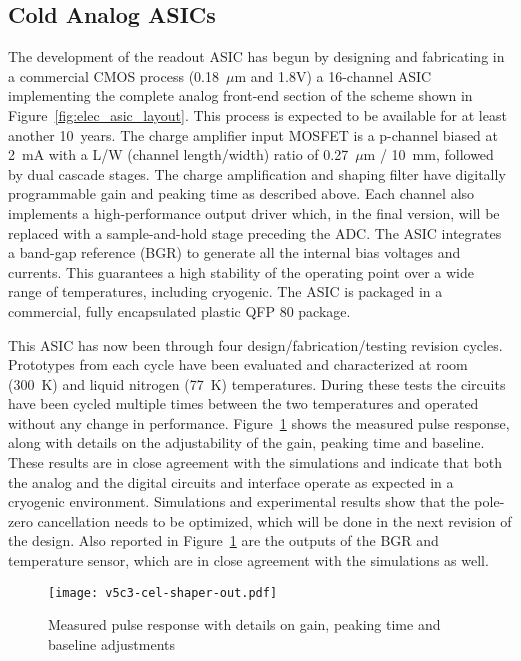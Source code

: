 %
\subsection{Cold Analog ASICs}
\label{subsec:fe_CMOS_analog}

The development of the readout ASIC has begun by designing and fabricating in a commercial CMOS
process (0.18~$\mu$m and 1.8V) a 16-channel
ASIC implementing the complete analog front-end section of the scheme shown in Figure~\ref{fig:elec_asic_layout}. 
This process is expected to be available for at least another 10~years. 
The charge amplifier input MOSFET is a p-channel biased at 2~mA with a L/W (channel length/width) ratio
of 0.27~$\mu$m / 10~mm, followed by dual cascade stages.
The charge amplification and shaping filter have
digitally programmable gain and peaking time as described above.
Each channel also implements a high-performance output driver which, in the
final version, will be replaced with a sample-and-hold stage preceding the ADC.
The ASIC integrates a band-gap reference (BGR)  to generate all the internal bias voltages and currents.
This guarantees a high stability of the operating point over a wide range of
temperatures, including cryogenic.
The ASIC is packaged in a commercial, fully encapsulated plastic QFP 80 package.

This ASIC has now been through four design/fabrication/testing revision cycles.
Prototypes from each cycle have been evaluated and characterized at room (300~K) and liquid nitrogen (77~K) temperatures.
During these tests the circuits have been cycled multiple times
between the two temperatures and operated without any change in performance.
Figure~\ref{fig:ce_elec_shaper_out} shows the measured pulse response, along with
details on the adjustability of the gain, peaking time and baseline.
These results are in close agreement with the simulations and indicate
that both the analog and the digital circuits and interface operate as
expected in a cryogenic environment.
Simulations and experimental results show that the pole-zero cancellation needs to be optimized,
which will be done in the next revision of the design.
Also reported in Figure~\ref{fig:ce_elec_shaper_out} are the outputs of the BGR and temperature sensor,
which are in close agreement with the simulations as well.

\begin{figure}[htbp]
\centering
\texttt{[image: v5c3-cel-shaper-out.pdf]}
\caption[Measured pulse response with details]{Measured pulse response with details on gain, peaking time and baseline adjustments}
\label{fig:ce_elec_shaper_out}
\end{figure}

